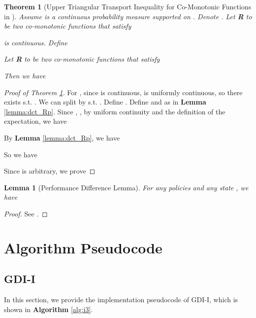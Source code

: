 \documentclass[nohyperref]{article}
\theoremstyle{plain}
\newtheorem{Theorem}{\textbf{Theorem}}
\newtheorem{Lemma}{\textbf{Lemma}}
\begin{document}
\begin{Theorem}[Upper Triangular Transport Inequality for Co-Monotonic Functions in ]
Assume  is a continuous probability measure supported on . 
Denote .
Let  \textbf{R} to be two co-monotonic functions that satisfy

 is continuous.
Define 
 
Let  \textbf{R} to be two co-monotonic functions that satisfy

Then we have

\label{thm:cts_Rp}
\end{Theorem}

\begin{proof}[Proof of Theorem \ref{thm:cts_Rp}]


For , since  is continuous,  is uniformly continuous, so there exists  s.t. .
We can split  by  s.t. .
Define .
Define  and  as in \textbf{Lemma} \ref{lemma:dct_Rp}.
Since , 
, by uniform continuity and the definition of the expectation, we have

By \textbf{Lemma} \ref{lemma:dct_Rp}, we have 

So we have

Since  is arbitrary, we prove 

\end{proof}

\begin{Lemma}[Performance Difference Lemma]
For any policies  and any state , we have

\label{lemma:perfdiff}
\end{Lemma}

\begin{proof}
    See \citep{kakade2002approximately}.
\end{proof}


\clearpage


\section{Algorithm Pseudocode}
\label{App: Algorithm Pseudocode}

\subsection{GDI-I}
In this section, we provide the implementation pseudocode of GDI-I, which is shown in \textbf{Algorithm} \ref{alg:i3}.
\end{document}
